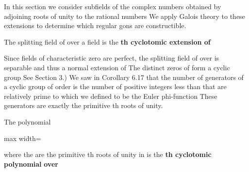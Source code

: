 \documentclass[11pt,oneside]{article}
\begin{document}
\fi
\renewcommand{\BookFooter}{Section 48 Cyclotomic Extensions}
\ifdefined\BookMaster\else\setcounter{page}{378}\fi
\BookNarrativetrue

\begin{BookBody}



\noindent In this section we consider subfields of the complex numbers obtained by adjoining roots of unity to the rational numbers We apply Galois theory to these extensions to determine which regular gons are constructible.

 The splitting field of  over a field  is the \textbf{th cyclotomic extension of} \BookEnd{\blacksquare}

Since fields of characteristic zero are perfect, the splitting field of  over  is separable and thus a normal extension of  The distinct  zeros of  form a cyclic group See Section 3.) We saw in Corollary 6.17 that the number of generators of a cyclic group of order  is the number of positive integers less than  that are relatively prime to  which we defined to be the Euler phi-function  These  generators are exactly the primitive th roots of unity.

 The polynomial

\begin{center}\begin{adjustbox}{max width=\linewidth}\end{adjustbox}\end{center}

\noindent where the  are the primitive th roots of unity in  is the \textbf{th cyclotomic polynomial} \textbf{over} \BookEnd{\blacksquare}


\end{BookBody}
\end{document}
